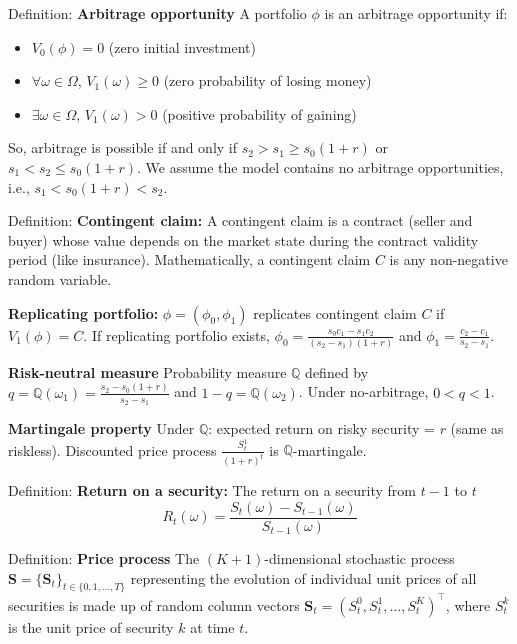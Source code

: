 \documentclass[12pt,a4paper]{article}
\begin{document}
Definition: \textbf{Arbitrage opportunity}
\vspace{0.5em}
A portfolio $\phi$ is an arbitrage opportunity if:
\begin{itemize}
	\item[A1:] $V_0(\phi) = 0$ (zero initial investment)
	\item[A2:] $\forall \omega \in \Omega$, $V_1(\omega) \geq 0$ (zero probability of losing money)
	\item[A3:] $\exists \omega \in \Omega$, $V_1(\omega) > 0$ (positive probability of gaining)
\end{itemize}
\vspace{1em}
So, arbitrage is possible if and only if $s_2 > s_1 \geq s_0(1+r)$ or $s_1 < s_2 \leq s_0(1+r)$.
We assume the model contains no arbitrage opportunities, i.e., $s_1 < s_0(1+r) < s_2$.
\vspace{1em}

Definition: \textbf{Contingent claim:}
A contingent claim is a contract (seller and buyer) whose value depends on the market state during the contract validity period (like insurance). Mathematically, a contingent claim $C$ is any non-negative random variable.
\vspace{1em}

\textbf{Replicating portfolio:}
 $\phi = (\phi_0, \phi_1)$ replicates contingent claim $C$ if $V_1(\phi) = C$. If replicating portfolio exists, $\phi_0 = \frac{s_0 c_1 - s_1 c_2}{(s_2-s_1)(1+r)}$ and $\phi_1 = \frac{c_2 - c_1}{s_2 - s_1}$.
\vspace{1em}

\textbf{Risk-neutral measure}
Probability measure $\mathbb{Q}$ defined by $q = \mathbb{Q}(\omega_1) = \frac{s_2 - s_0(1+r)}{s_2 - s_1}$ and $1-q = \mathbb{Q}(\omega_2)$. Under no-arbitrage, $0 < q < 1$.
\vspace{1em}

\textbf{Martingale property}
Under $\mathbb{Q}$: expected return on risky security = $r$ (same as riskless). Discounted price process $\frac{S_t^1}{(1+r)^t}$ is $\mathbb{Q}$-martingale.
\vspace{1em}

Definition: \textbf{Return on a security:}
The return on a security from $t-1$ to $t$ 
\[
R_t(\omega) = \frac{S_t(\omega) - S_{t-1}(\omega)}{S_{t-1}(\omega)}
\]
\vspace{1em}

Definition: \textbf{Price process}
\vspace{0.5em}
The $(K+1)$-dimensional stochastic process $\mathbf{S} = \{\mathbf{S}_t\}_{t \in \{0,1,\ldots,T\}}$ representing the evolution of individual unit prices of all securities is made up of random column vectors $\mathbf{S}_t = (S_t^0, S_t^1, \ldots, S_t^K)^\top$, where $S_t^k$ is the unit price of security $k$ at time $t$.
\vspace{1em}
\end{document}
